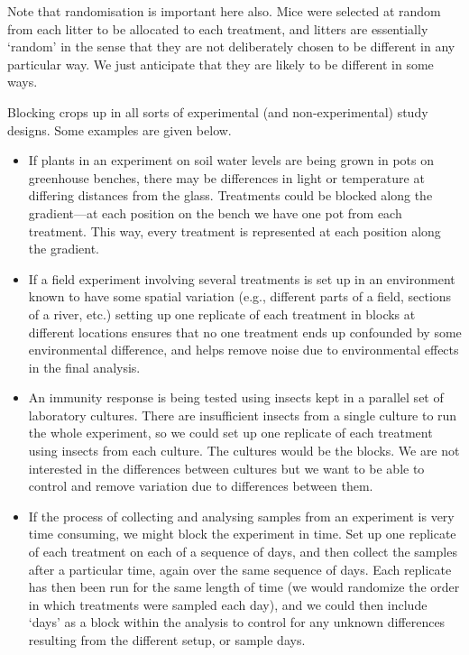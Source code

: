 \documentclass[
]{book}
\begin{document}
Note that randomisation is important here also. Mice were selected at random from each litter to be allocated to each treatment, and litters are essentially `random' in the sense that they are not deliberately chosen to be different in any particular way. We just anticipate that they are likely to be different in some ways.

Blocking crops up in all sorts of experimental (and non-experimental) study designs. Some examples are given below.

\begin{itemize}
\item
  If plants in an experiment on soil water levels are being grown in pots on greenhouse benches, there may be differences in light or temperature at differing distances from the glass. Treatments could be blocked along the gradient---at each position on the bench we have one pot from each treatment. This way, every treatment is represented at each position along the gradient.
\item
  If a field experiment involving several treatments is set up in an environment known to have some spatial variation (e.g., different parts of a field, sections of a river, etc.) setting up one replicate of each treatment in blocks at different locations ensures that no one treatment ends up confounded by some environmental difference, and helps remove noise due to environmental effects in the final analysis.
\item
  An immunity response is being tested using insects kept in a parallel set of laboratory cultures. There are insufficient insects from a single culture to run the whole experiment, so we could set up one replicate of each treatment using insects from each culture. The cultures would be the blocks. We are not interested in the differences between cultures but we want to be able to control and remove variation due to differences between them.
\item
  If the process of collecting and analysing samples from an experiment is very time consuming, we might block the experiment in time. Set up one replicate of each treatment on each of a sequence of days, and then collect the samples after a particular time, again over the same sequence of days. Each replicate has then been run for the same length of time (we would randomize the order in which treatments were sampled each day), and we could then include `days' as a block within the analysis to control for any unknown differences resulting from the different setup, or sample days.
\end{itemize}
\end{document}
